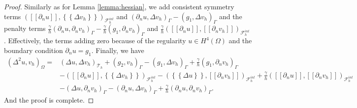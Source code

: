 \documentclass[11pt]{article}
\theoremstyle{remark}
\newcommand{\mean}[1]{\left\{\!\!\left\{#1\right\}\!\!\right\}}
\newcommand{\jump}[1]{\left[\!\left[ #1 \right]\!\right]}
\numberwithin{equation}{section}
\begin{document}
\begin{proof}
Similarly as for Lemma \ref{lemma:hessian}, we add consistent symmetry terms $(  \jump{ \partial _{n} u }, \mean{ \Delta  v_{h} })_{\mathcal{F}^{int}_{h} } $ and $(  \partial _{n} u, \Delta  v_{h}       )_{\Gamma  } -(  g_{1}, \Delta  v_{h}  )_{\Gamma  }  $ and
the penalty terms $ \frac{\gamma }{h} (  \partial _{n} u, \partial _{n}   v_{h}       )_{\Gamma  } -\frac{\gamma }{h}(  g_{1}, \partial _{n} v_{h}  )_{\Gamma  }$ and $\frac{\gamma }{h}( \jump{ \partial _{n} u } , \jump{ \partial _{n} v_{h} }
)_{\mathcal{F}^{int}_{h} }  $  . Effectively, the terms adding zero
because of the regularity $ u \in H^{4}( \Omega ) $ and the boundary condition $\partial _{n} u = g_{1}$.
Finally, we have
\[
    \begin{split}
( \Delta ^2 u, v_{h} ) _{\Omega }  =& ( \Delta u, \Delta v_{h})_{\mathcal{T} _{h} }  + ( g_{2} , v_{h} )_{\Gamma }  - ( g_{1} , \Delta v_{h})_{\Gamma } + \frac{\gamma }{h} ( g_{1} ,  \partial _{n}v_{h})_{\Gamma }\\
& -  ( \jump{ \partial _{n} u} , \mean{ \Delta v_{h} })_{\mathcal{F}_{h}^{int} }-  (  \mean{ \Delta u }, \jump{ \partial _{n} v_{h}} )_{\mathcal{F}_{h}^{int} } + \frac{\gamma }{h}  \left( \jump{ \partial _{n} u}, \jump{ \partial _{n} v_{h}   }
\right)_{\mathcal{F}_{h}^{int} } \\
& - (  \Delta u , \partial _{n} v_{h})_{\Gamma }- ( \partial _{n} u, \Delta v_{h})_{\Gamma } + \frac{\gamma }{h}( \partial _{n} u, \partial _{n} v_{h})_{\Gamma }   .
    \end{split}
\]
And the proof is complete.
\end{proof}
\end{document}
